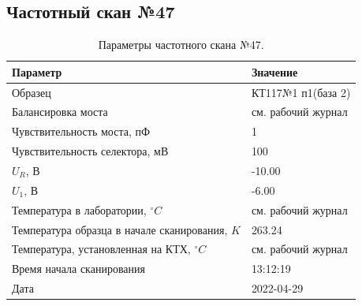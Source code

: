 \subsection{Частотный скан №47}
\begin{table}[!ht]
    \centering
    \caption{Параметры частотного скана №47.}
    \begin{tabular}{|l|l|}
        \hline
        Параметр                                       & Значение                  \\ \hline
        Образец                                        & КТ117№1 п1(база 2)        \\ \hline
        Балансировка моста                             & см. рабочий журнал        \\ \hline
        Чувствительность моста, пФ                     & 1                         \\ \hline
        Чувствительность селектора, мВ                 & 100                       \\ \hline
        $U_R$, В                                       & -10.00                    \\ \hline
        $U_1$, В                                       & -6.00                     \\ \hline
        Температура в лаборатории, $^\circ C$          & см. рабочий журнал        \\ \hline
        Температура образца в начале сканирования, $K$ & 263.24                    \\ \hline
        Температура, установленная на КТХ, $^\circ C$  & см. рабочий журнал        \\ \hline
        Время начала сканирования                      & 13:12:19                  \\ \hline
        Дата                                           & 2022-04-29                \\ \hline
    \end{tabular}
    \label{table:frequency_scan_47}
\end{table}

